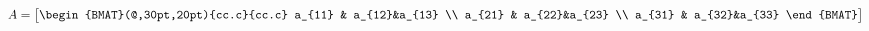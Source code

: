 \documentclass{book}
\begin{document}
\begin{equation*}
A= \begin{bmatrix}
\begin{BMAT}(@,30pt,20pt){cc.c}{cc.c}
a_{11} & a_{12}&a_{13} \\
a_{21} & a_{22}&a_{23} \\
a_{31} & a_{32}&a_{33}
\end{BMAT}
\end{bmatrix}
\end{equation*}
\end{document}
